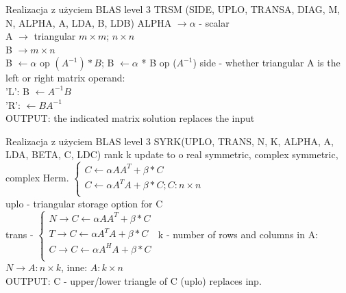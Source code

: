 	\begin{frame}{Realizacja z użyciem BLAS level 3}
		\textunderscore TRSM (SIDE, UPLO, TRANSA, DIAG, M, N, ALPHA, A, LDA, B, LDB) %
		ALPHA $\rightarrow \alpha$ - scalar \\
		A $\rightarrow$ triangular $m \times m$; $n \times n$ \\
		B $\rightarrow m \times n$ \\
		B $\leftarrow \alpha$ op $(A^{-1})*B$; B $\leftarrow \alpha$ * B op ($A^{-1}$) %
		side - whether triangular A is the left or right matrix operand: \\
		'L': B $\leftarrow A^{-1}B$ \\
		'R': $\leftarrow BA^{-1}$ \\
		OUTPUT: the indicated matrix solution replaces the input
	\end{frame}
	
	\begin{frame}{Realizacja z użyciem BLAS level 3}
		\textunderscore SYRK(UPLO, TRANS, N, K, ALPHA, A, LDA, BETA, C, LDC)
		rank k update to o real symmetric, complex symmetric, complex Herm. %
		$
		\begin{cases}
			C \leftarrow \alpha A A^T + \beta * C \\
			C \leftarrow \alpha A^T A + \beta * C; C: n \times n \\
		\end{cases}
		$ \\
		uplo - triangular storage option for C \\
		trans - $
		\begin{cases}
			N \rightarrow C \leftarrow \alpha A A^T + \beta * C \\
			T \rightarrow C \leftarrow \alpha A^T A + \beta * C \\
			C \rightarrow C \leftarrow \alpha A^H A + \beta * C \\
		\end{cases}$
		k - number of rows and columns in A: $N \rightarrow A: n \times k$, inne: $A: k \times n$ \\
		OUTPUT: C - upper/lower triangle of C (uplo) replaces inp.
	\end{frame}
	
